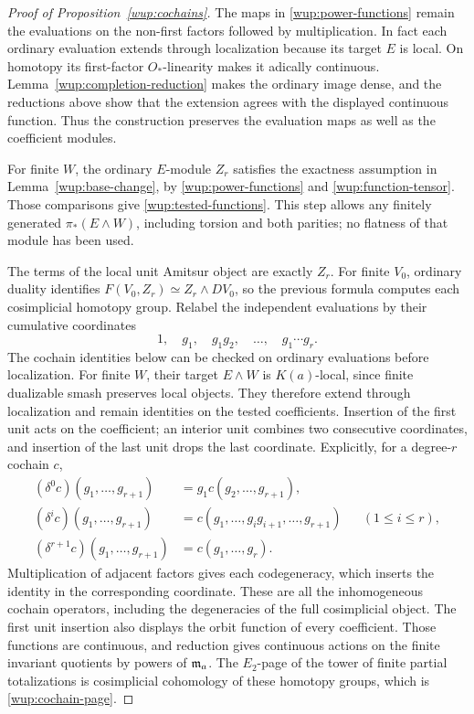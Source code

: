 \begin{proof}[Proof of Proposition~\ref{wup:cochains}]
The maps in \eqref{wup:power-functions} remain the evaluations on
the non-first factors followed by multiplication. In fact each
ordinary evaluation extends through localization because its target
\(E\) is local. On homotopy its first-factor \(O_*\)-linearity makes
it adically continuous. Lemma~\ref{wup:completion-reduction}
makes the ordinary image dense, and the reductions above show that
the extension agrees with the displayed continuous function.
Thus the construction preserves the evaluation maps as well as the
coefficient modules.

For finite \(W\), the ordinary \(E\)-module \(Z_r\) satisfies the
exactness assumption in Lemma~\ref{wup:base-change}, by
\eqref{wup:power-functions} and \eqref{wup:function-tensor}.
Those comparisons give \eqref{wup:tested-functions}. This step
allows any finitely generated \(\pi_*(E\wedge W)\), including
torsion and both parities; no flatness of that module has been used.

The terms of the local unit Amitsur object are exactly \(Z_r\).
For finite \(V_0\), ordinary duality identifies
\(F(V_0,Z_r)\simeq Z_r\wedge D V_0\), so the previous formula
computes each cosimplicial homotopy group. Relabel the independent
evaluations by their cumulative coordinates
\[
 1,\quad g_1,\quad g_1g_2,\quad\ldots,\quad g_1\cdots g_r.
\]
The cochain identities below can be checked on ordinary evaluations before
localization. For finite $W$, their target $E\wedge W$ is $K(a)$-local,
since finite dualizable smash preserves local objects. They therefore
extend through localization and remain identities on the tested
coefficients. Insertion of the first unit acts on the coefficient; an
interior unit combines two consecutive coordinates, and
insertion of the last unit drops the last coordinate. Explicitly,
for a degree-\(r\) cochain \(c\),
\[
\begin{aligned}
 (\delta^0c)(g_1,\ldots,g_{r+1})
   &=g_1c(g_2,\ldots,g_{r+1}),\\
 (\delta^ic)(g_1,\ldots,g_{r+1})
   &=c(g_1,\ldots,g_i g_{i+1},\ldots,g_{r+1})
       &&(1\leq i\leq r),\\
 (\delta^{r+1}c)(g_1,\ldots,g_{r+1})
   &=c(g_1,\ldots,g_r).
\end{aligned}
\]
Multiplication of adjacent factors gives each codegeneracy, which
inserts the identity in the corresponding coordinate. These are all
the inhomogeneous cochain operators, including the degeneracies of
the full cosimplicial object. The first unit insertion also displays
the orbit function of every coefficient. Those functions are
continuous, and reduction gives continuous actions on the finite
invariant quotients by powers of \(\mathfrak m_a\). The \(E_2\)-page of the
tower of finite partial totalizations is cosimplicial cohomology
of these homotopy groups, which is \eqref{wup:cochain-page}.
\end{proof}
